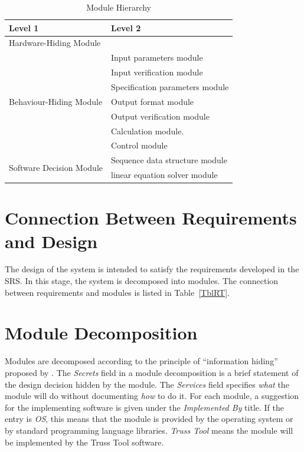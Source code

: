 \documentclass[12pt, titlepage]{article}
\begin{document}
\begin{table}[h!]
\centering
\begin{tabular}{p{} p{}}
\toprule
\textbf{Level 1} & \textbf{Level 2}\\
\midrule

{Hardware-Hiding Module} & ~ \\
\midrule

\multirow{7}{0.3\textwidth}{Behaviour-Hiding Module} & Input parameters module\\
& Input verification module\\
& Specification parameters module\\
& Output format module\\
& Output verification module\\
& Calculation module.\\
& Control module\\ 

\midrule

\multirow{3}{0.3\textwidth}{Software Decision Module} & Sequence data structure module\\
& linear equation solver module\\
\bottomrule

\end{tabular}
\caption{Module Hierarchy}
\label{TblMH}
\end{table}

\section{Connection Between Requirements and Design} \label{SecConnection}

The design of the system is intended to satisfy the requirements developed in
the SRS. In this stage, the system is decomposed into modules. The connection
between requirements and modules is listed in Table~\ref{TblRT}.

\section{Module Decomposition} \label{SecMD}

Modules are decomposed according to the principle of ``information hiding''
proposed by \citet{ParnasEtAl1984}. The \emph{Secrets} field in a module
decomposition is a brief statement of the design decision hidden by the
module. The \emph{Services} field specifies \emph{what} the module will do
without documenting \emph{how} to do it. For each module, a suggestion for the
implementing software is given under the \emph{Implemented By} title. If the
entry is \emph{OS}, this means that the module is provided by the operating
system or by standard programming language libraries.  \emph{Truss Tool} means the
module will be implemented by the Truss Tool software.
\end{document}
